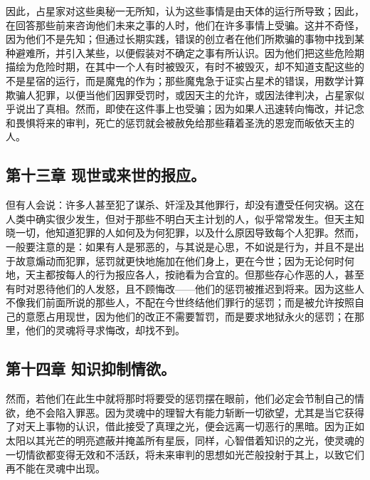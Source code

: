 因此，占星家对这些奥秘一无所知，认为这些事情是由天体的运行所导致；因此，在回答那些前来咨询他们未来之事的人时，他们在许多事情上受骗。这并不奇怪，因为他们不是先知；但通过长期实践，错误的创立者在他们所欺骗的事物中找到某种避难所，并引入某些，以便假装对不确定之事有所认识。因为他们把这些危险期描绘为危险时期，在其中一个人有时被毁灭，有时不被毁灭，却不知道支配这些的不是星宿的运行，而是魔鬼的作为；那些魔鬼急于证实占星术的错误，用数学计算欺骗人犯罪，以便当他们因罪受罚时，或因天主的允许，或因法律判决，占星家似乎说出了真相。然而，即使在这件事上也受骗；因为如果人迅速转向悔改，并记念和畏惧将来的审判，死亡的惩罚就会被赦免给那些藉着圣洗的恩宠而皈依天主的人。\par


\subsection{第十三章 现世或来世的报应。}

但有人会说：许多人甚至犯了谋杀、奸淫及其他罪行，却没有遭受任何灾祸。这在人类中确实很少发生，但对于那些不明白天主计划的人，似乎常常发生。但天主知晓一切，他知道犯罪的人如何及为何犯罪，以及什么原因导致每个人犯罪。然而，一般要注意的是：如果有人是邪恶的，与其说是心思，不如说是行为，并且不是出于故意煽动而犯罪，惩罚就更快地施加在他们身上，更在今世；因为无论何时何地，天主都按每人的行为报应各人，按祂看为合宜的。但那些存心作恶的人，甚至有时对恩待他们的人发怒，且不顾悔改——他们的惩罚被推迟到将来。因为这些人不像我们前面所说的那些人，不配在今世终结他们罪行的惩罚；而是被允许按照自己的意愿占用现世，因为他们的改正不需要暂罚，而是要求地狱永火的惩罚；在那里，他们的灵魂将寻求悔改，却找不到。\par


\subsection{第十四章 知识抑制情欲。}

然而，若他们在此生中就将那时将要受的惩罚摆在眼前，他们必定会节制自己的情欲，绝不会陷入罪恶。因为灵魂中的理智大有能力斩断一切欲望，尤其是当它获得了对天上事物的认识，借此接受了真理之光，便会远离一切恶行的黑暗。因为正如太阳以其光芒的明亮遮蔽并掩盖所有星辰，同样，心智借着知识的之光，使灵魂的一切情欲都变得无效和不活跃，将未来审判的思想如光芒般投射于其上，以致它们再不能在灵魂中出现。\par

